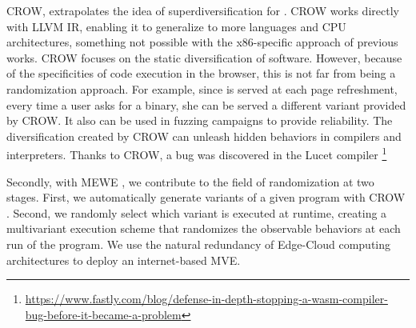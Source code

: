 CROW, extrapolates the idea of superdiversification \cite{jacob2008superdiversifier} for \wasm. CROW works directly with LLVM IR, enabling it to generalize to more languages and CPU architectures, something not possible with the x86-specific approach of previous works.
CROW focuses on the static diversification of software. However, because of the specificities of code execution in the browser, this is not far from being a randomization approach. For example, since \wasm is served at each page refreshment, every time a user asks for a \wasm binary, she can be served a different variant provided by CROW.
It also can be used in fuzzing campaigns \citationneeded to provide reliability. The diversification created by CROW can unleash hidden behaviors in compilers and interpreters. Thanks to CROW, a bug was discovered in the Lucet compiler \footnote{\url{https://www.fastly.com/blog/defense-in-depth-stopping-a-wasm-compiler-bug-before-it-became-a-problem}} 


Secondly, with MEWE \cite{MEWE}, we contribute to the field of randomization at two stages. First, we automatically generate variants of a given program with CROW \cite{CROW}. Second, we randomly select which variant is executed at runtime, creating a multivariant execution scheme that randomizes the observable behaviors at each run of the program. We use the natural redundancy of Edge-Cloud computing architectures to deploy an internet-based MVE.



